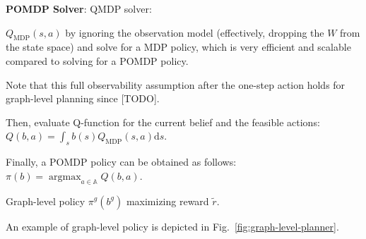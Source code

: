 \documentclass[letterpaper]{article} %
\newcommand{\ph}[1]{{\textbf{#1}:}} %
\newcommand{\argmax}{\mathop{\mathrm{argmax}}}
\begin{document}
\ph{POMDP Solver}
QMDP solver:

$Q_{\mathrm{MDP}}(s, a)$ by ignoring the observation model (effectively, dropping the $W$ from the state space) and solve for a MDP policy, which is very efficient and scalable compared to solving for a POMDP policy.

Note that this full observability assumption after the one-step action holds for graph-level planning since [TODO].

Then, evaluate Q-function for the current belief and the feasible actions:
$Q(b, a) = \int_s b(s) Q_{\mathrm{MDP}}(s, a) \mathrm{d}s$.

Finally, a POMDP policy can be obtained as follows:
$\pi(b) = \argmax_{a \in \mathbb{A}} Q(b, a)$.

Graph-level policy $\pi^g(b^g)$ maximizing reward $\tilde{r}$.

An example of graph-level policy is depicted in Fig.~\ref{fig:graph-level-planner}.
\end{document}
